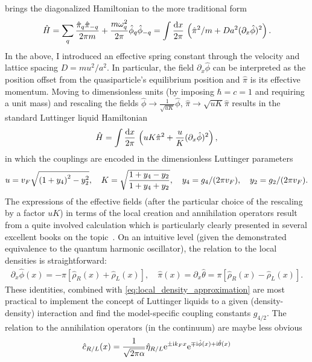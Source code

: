 brings the diagonalized Hamiltonian to the more traditional form
\begin{align}
    \hat H = \sum_q \frac{\hat\pi_q\hat\pi_{-q}}{2\pi m} + \frac{m\omega_q^2}{2\pi}\hat\phi_q\hat\phi_{-q}
    =
    \int\frac{\mathrm d x}{2\pi}\, \left( \hat\pi^2/m + {Da^2}(\partial_x\hat\phi)^2 \right).
\end{align}
In the above, I introduced an effective spring constant through the velocity and lattice spacing $D=mu^2/a^2$.
In particular, the field $\partial_x\hat\phi$ can be interpreted as the position offset from the quasiparticle's equilibrium position and $\hat\pi$ is its effective momentum.
Moving to dimensionless units (by imposing $\hbar=c=1$ and requiring a unit mass) and rescaling the fields $\hat\phi\rightarrow \frac1{\sqrt{uK}}\hat\phi$, $\hat\pi\rightarrow \sqrt{uK}\hat\pi$ results in the standard Luttinger liquid Hamiltonian
\begin{align}
    \hat H = \int\frac{\mathrm d x}{2\pi}\, \left( uK\hat\pi^2 + \frac uK(\partial_x\hat\phi)^2 \right),
    \label{eq:ll_hamiltonian}
\end{align}
in which the couplings are encoded in the dimensionless Luttinger parameters
\begin{align}
    u = v_F\sqrt{\left( 1 + y_4 \right)^2 - y_2^2},
    \quad
    K = \sqrt{\frac{1+y_4-y_2}{1+y_4+y_2}},
    \quad
    y_4=g_4/(2\pi v_F),
    \quad
    y_2=g_2/(2\pi v_F).
\end{align}
The expressions of the effective fields (after the particular choice of the rescaling by a factor $uK$) in terms of the local creation and annihilation operators result from a quite involved calculation which is particularly clearly presented in several excellent books on the topic~\cite{Bruus2004,Giamarchi2003,Gogolin2004}.
On an intuitive level (given the demonstrated equivalence to the quantum harmonic oscillator), the relation to the local densities is straightforward:
\begin{align}
    \partial_x\hat\phi(x)=-\pi[\hat\rho_R(x)+\hat\rho_L(x)],
    \quad
    \hat\pi(x)=\partial_x\hat\theta=\pi[\hat\rho_R(x)-\hat\rho_L(x)].
\end{align}
These identities, combined with \cref{eq:local_density_approximation} are most practical to implement the concept of Luttinger liquids to a given (density-density) interaction and find the model-specific coupling constants $g_{4/2}$.
The relation to the annihilation operators (in the continuum) are maybe less obvious
\begin{align}
    \hat c_{R/L}(x) = \frac1{\sqrt{2\pi\alpha}}\hat \eta_{R/L}\mathrm e^{\pm\mathrm i k_F x}\mathrm e^{\mp\mathrm i\hat \phi(x) + \mathrm i\hat \theta(x)}
    \label{eq:bosonization_identity}
\end{align}
